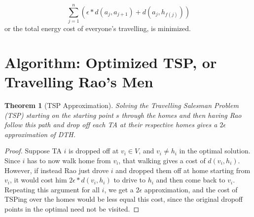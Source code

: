 \documentclass{article}
\newtheorem{theorem}{Theorem}[section]
\theoremstyle{definition}
\theoremstyle{remark}
\begin{document}
         $$\sum_{j = 1}^{n} \left( \epsilon * d(a_j, a_{j+1}) + d(a_j, h_{f(j)}) \right) $$ or the total energy cost of everyone's travelling, is minimized. 
      
         
\section{Algorithm: Optimized TSP, or Travelling Rao's Men}
		
		\begin{theorem}[TSP Approximation] 
			Solving the Travelling Salesman Problem (TSP) starting on the starting point $s$ through the homes and then having Rao follow this path and drop off each TA at their respective homes gives a $2 \epsilon$ approximation of DTH.
		\end{theorem}
		\begin{proof}
			Suppose TA $i$ is dropped off at $v_i \in V$, and $v_i \neq h_i$ in the optimal solution. Since $i$ has to now walk home from $v_i$, that walking gives a cost of $d(v_i, h_i)$. However, if instead Rao just drove $i$ and dropped them off at home starting from $v_i$, it would cost him $2 \epsilon * d(v_i, h_i)$ to drive to $h_i$ and then come back to $v_i$. Repeating this argument for all $i$, we get a $2 \epsilon$ approximation, and the cost of TSPing over the homes would be less equal this cost, since the original dropoff points in the optimal need not be visited.
		\end{proof}
        
	
	
	
\end{document}
